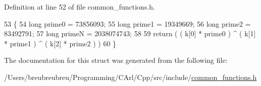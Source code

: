Definition at line 52 of file common\+\_\+functions.\+h.


\begin{DoxyCode}
53     \{
54         \textcolor{keywordtype}{long} prime0 = 73856093;
55         \textcolor{keywordtype}{long} prime1 = 19349669;
56         \textcolor{keywordtype}{long} prime2 = 83492791;
57         \textcolor{keywordtype}{long} primeN = 2038074743;
58 
59         \textcolor{keywordflow}{return} ( ( k[0] * prime0 ) ^ ( k[1] * prime1 ) ^ ( k[2] * prime2 ) ) %
60     \}
\end{DoxyCode}


The documentation for this struct was generated from the following file\+:\begin{DoxyCompactItemize}
\item 
/\+Users/breubreubreu/\+Programming/\+C\+Arl/\+Cpp/src/include/\hyperlink{common__functions_8h}{common\+\_\+functions.\+h}\end{DoxyCompactItemize}

